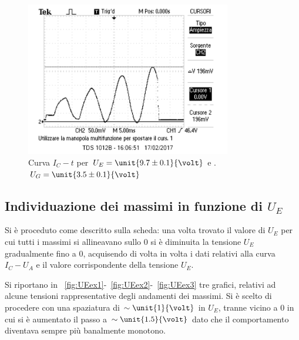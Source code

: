 \documentclass[10pt,a4paper]{article}
\begin{document}
\begin{figure}[h!]
	\centering
	\includegraphics[width=0.80\textwidth]{../oscilloscopio/Task6_3.png}
	\caption{Curva $I_{C} - t$ per $U_{E}=\unit{9.7 \pm 0.1}{\volt}$ e .$U_{G}=\unit{3.5 \pm 0.1}{\volt}$}
	\label{task6.3}
\end{figure}

\subsection{Individuazione dei massimi in funzione di $U_E$}

Si è proceduto come descritto sulla scheda: una volta trovato il valore di $U_E$ per cui tutti i massimi si allineavano sullo 0 si è diminuita la tensione $U_E$ gradualmente fino a 0, acquisendo di volta in volta i dati relativi alla curva $I_{C} - U_{A}$ e il valore corrispondente della tensione $U_E$.

Si riportano in \figurename{~\ref{fig:UEex1}-~\ref{fig:UEex2}-~\ref{fig:UEex3}} tre grafici, relativi ad alcune tensioni rappresentative degli andamenti dei massimi.
Si è scelto di procedere con una spaziatura di $\sim \unit{1}{\volt}$ in $U_E$, tranne vicino a 0 in cui si è aumentato il passo a $\sim \unit{1.5}{\volt}$ dato che il comportamento diventava sempre più banalmente monotono.
\end{document}
